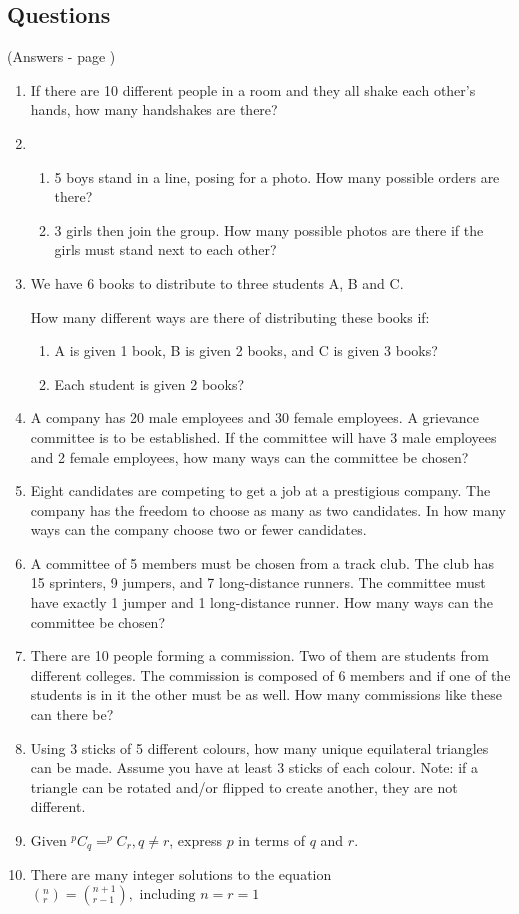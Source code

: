 \documentclass[../main.tex]{subfiles}
\begin{document}
\subsection*{Questions}
(Answers - page \pageref{Combinations answers})
\label{Combinations and permuations}
\begin{enumerate}[itemsep=1cm]
    \item 
    If there are 10 different people in a room and they all shake each other’s hands, how many handshakes are there?
    \item 
        \begin{enumerate}
            \item 5 boys stand in a line, posing for a photo. How many possible orders are there?
            \item 3 girls then join the group. How many possible photos are there if the girls must stand next to each other?
        \end{enumerate}
    \item 
    We have 6 books to distribute to three students A, B and C.

    How many different ways are there of distributing these books if:
        \begin{enumerate}
            \item A is given 1 book, B is given 2 books, and C is given 3 books?
            \item Each student is given 2 books?
        \end{enumerate}
    \item 
    A company has 20 male employees and 30 female employees. A grievance committee is to be established. If the committee will have 3 male employees and 2 female employees, how many ways can the committee be chosen?
    \item 
    Eight candidates are competing to get a job at a prestigious company. The company has the freedom to choose as many as two candidates. In how many ways can the company choose two or fewer candidates.
    \item 
    A committee of 5 members must be chosen from a track club. The club has 15 sprinters, 9 jumpers, and 7 long-distance runners. The committee must have exactly 1 jumper and 1 long-distance runner. How many ways can the committee be chosen?
    \item 
    There are 10 people forming a commission. Two of them are students from different colleges. The commission is composed of 6 members and if one of the students is in it the other must be as well. How many commissions like these can there be?
    \item 
    Using 3 sticks of 5 different colours, how many unique equilateral triangles can be made. Assume you have at least 3 sticks of each colour. Note: if a triangle can be rotated and/or flipped to create another, they are not different.
    \item 
    Given \(^pC_q=^pC_r, q\neq r\), express \(p\) in terms of \(q\) and \(r\).
    \item 
    There are many integer solutions to the equation \((^n_r)=(^{n+1}_{r-1}),\text{ including } n=r=1 \)
    

\end{enumerate}
\end{document}
